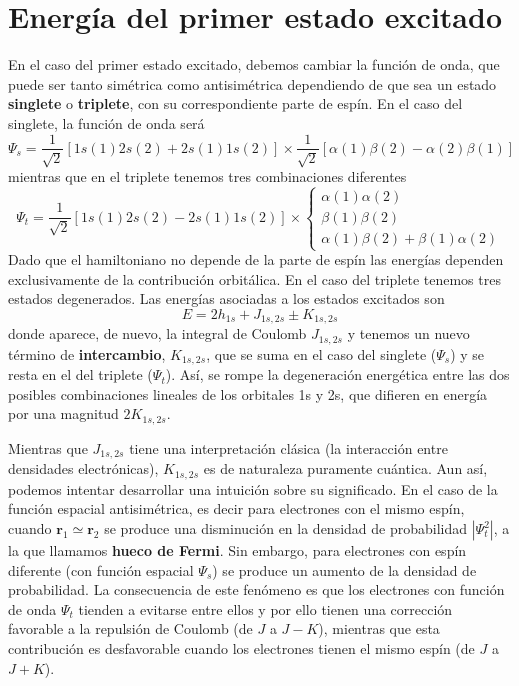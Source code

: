 \documentclass{tufte-handout}
\begin{document}
\section{Energía del primer estado excitado}
En el caso del primer estado excitado, debemos cambiar la función 
de onda, que puede ser tanto simétrica como antisimétrica 
dependiendo de que sea un estado \textbf{singlete} o 
\textbf{triplete}, con su correspondiente parte de espín. 
En el caso del singlete, la función de onda será
\begin{equation}
    \Psi_s=\frac{1}{\sqrt{2}}[1s(1)2s(2)+2s(1)1s(2)]\times
    \frac{1}{\sqrt{2}}[\alpha(1)\beta(2)-\alpha(2)\beta(1)]
\end{equation}
mientras que en el triplete tenemos tres combinaciones diferentes
\begin{equation}
\Psi_t=\frac{1}{\sqrt{2}}[1s(1)2s(2)-2s(1)1s(2)]\times
\begin{cases}
\alpha(1)\alpha(2)\\
\beta(1)\beta(2) \\
\alpha(1)\beta(2) + \beta(1)\alpha(2)
\end{cases}
\end{equation}
Dado que el hamiltoniano no depende de la parte de espín
las energías dependen exclusivamente de la contribución
orbitálica. En el caso del triplete tenemos tres estados 
degenerados. Las energías asociadas a los estados excitados
son 
\begin{equation}
    E=2h_{1s} + J_{1s,2s} \pm K_{1s,2s}
\end{equation}
donde aparece, de nuevo, la integral de Coulomb $J_{1s,2s}$
y tenemos un nuevo término de \textbf{intercambio}, $K_{1s,2s}$, que se
suma en el caso del singlete ($\Psi_s$) y se resta en el del triplete ($\Psi_t$). Así, se rompe la degeneración energética
entre las dos posibles combinaciones lineales de los orbitales
1s y 2s, que difieren en energía por una magnitud $2K_{1s,2s}$.

Mientras que $J_{1s,2s}$ tiene una interpretación clásica
(la interacción entre densidades electrónicas), 
$K_{1s,2s}$ es de naturaleza puramente cuántica. Aun así, 
podemos intentar desarrollar una intuición sobre su significado. En el caso de la función espacial antisimétrica,
es decir para electrones con el mismo espín, 
cuando $\mathbf{r}_1\simeq\mathbf{r}_2$ se produce una
disminución en la densidad de probabilidad $|\Psi_t^2|$,
a la que llamamos \textbf{hueco de Fermi}. Sin embargo,
para electrones con espín diferente (con función espacial $\Psi_s$) se produce un aumento de la densidad de probabilidad.
La consecuencia de este fenómeno es que los electrones con 
función de onda $\Psi_t$ tienden a evitarse entre ellos y
por ello tienen una corrección favorable a la repulsión de Coulomb (de $J$ a $J-K$), mientras que esta contribución es desfavorable cuando los electrones tienen el mismo 
espín (de $J$ a $J+K$).
 
\end{document}
